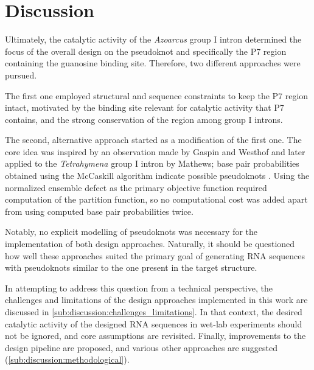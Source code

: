 \documentclass[../../master.tex]{subfiles}
\begin{document}
\section{Discussion}
\label{sec:discussion}

Ultimately, the catalytic activity of the \textit{Azoarcus} group I intron determined the focus of the overall design on the pseudoknot and specifically the P7 region containing the guanosine binding site.
Therefore, two different approaches were pursued.

The first one employed structural and sequence constraints to keep the P7 region intact, motivated by the binding site relevant for catalytic activity that P7 contains, and the strong conservation of the region among group I introns.

The second, alternative approach started as a modification of the first one.
The core idea was inspired by an observation made by Gaspin and Westhof and later applied to the \textit{Tetrahymena} group I intron by Mathews; base pair probabilities obtained using the McCaskill algorithm indicate possible pseudoknots \parencite{gaspin_interactive_1995, mathews_using_2004}.
Using the normalized ensemble defect as the primary objective function required computation of the partition function, so no computational cost was added apart from using computed base pair probabilities twice.

Notably, no explicit modelling of pseudoknots was necessary for the implementation of both design approaches.
Naturally, it should be questioned how well these approaches suited the primary goal of generating RNA sequences with pseudoknots similar to the one present in the target structure.

In attempting to address this question from a technical perspective, the challenges and limitations of the design approaches implemented in this work are discussed in \autoref{sub:discussion:challenges_limitations}.
In that context, the desired catalytic activity of the designed RNA sequences in wet-lab experiments should not be ignored, and core assumptions are revisited.
Finally, improvements to the design pipeline are proposed, and various other approaches are suggested (\autoref{sub:discussion:methodological}).
\end{document}
